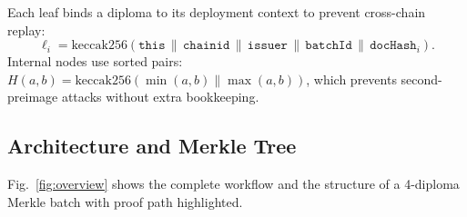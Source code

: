 \documentclass[conference]{IEEEtran}
\begin{document}
Each leaf binds a diploma to its deployment context to prevent
cross-chain replay:
\begin{equation}
\ell_i = \mathrm{keccak256}(
  \texttt{this} \,\|\,
  \texttt{chainid} \,\|\,
  \texttt{issuer} \,\|\,
  \texttt{batchId} \,\|\,
  \texttt{docHash}_i).
\label{eq:leaf}
\end{equation}
Internal nodes use sorted pairs:
$H(a,b)=\mathrm{keccak256}(\min(a,b)\|\max(a,b))$,
which prevents second-preimage attacks without extra bookkeeping.

\subsection{Architecture and Merkle Tree}

Fig.~\ref{fig:overview} shows the complete workflow and the
structure of a 4-diploma Merkle batch with proof path highlighted.
\end{document}
